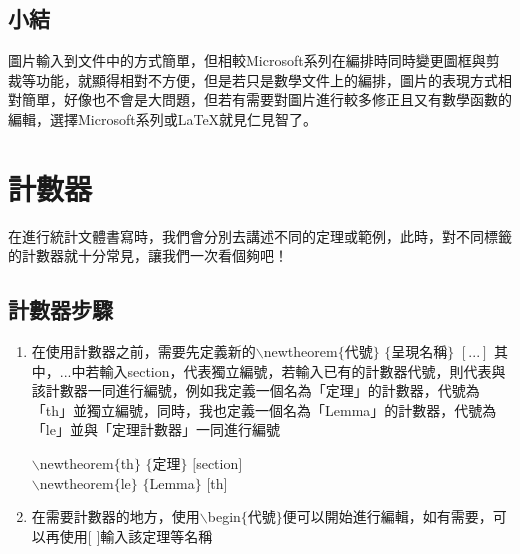 \section*{小結}
圖片輸入到文件中的方式簡單，但相較Microsoft系列在編排時同時變更圖框與剪裁等功能，就顯得相對不方便，但是若只是數學文件上的編排，圖片的表現方式相對簡單，好像也不會是大問題，但若有需要對圖片進行較多修正且又有數學函數的編輯，選擇Microsoft系列或\LaTeX 就見仁見智了。

\chapter{計數器}
在進行統計文體書寫時，我們會分別去講述不同的定理或範例，此時，對不同標籤的計數器就十分常見，讓我們一次看個夠吧！
\section{計數器步驟}
\begin{enumerate}[1.]
\item
在使用計數器之前，需要先定義新的$\backslash$newtheorem$\{$代號$\}$ $\{$呈現名稱$\}$ $[...]$ 其中，...中若輸入section，代表獨立編號，若輸入已有的計數器代號，則代表與該計數器一同進行編號，例如我定義一個名為「定理」的計數器，代號為「th」並獨立編號，同時，我也定義一個名為「Lemma」的計數器，代號為「le」並與「定理計數器」一同進行編號\\
\begin{center}
$\backslash$newtheorem$\{$th$\}$ $\{$定理$\}$ $[$section$]$\\
$\backslash$newtheorem$\{$le$\}$ $\{$Lemma$\}$ $[$th$]$\\
\end{center}
\item 
在需要計數器的地方，使用$\backslash$begin$\{$代號$\}$便可以開始進行編輯，如有需要，可以再使用$[$ $]$輸入該定理等名稱
\end{enumerate}
